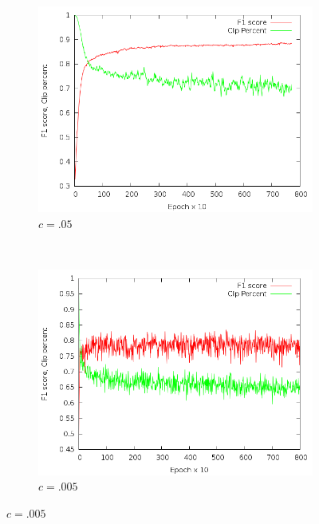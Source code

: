 \documentclass{article}
\begin{document}
\begin{figure}[t!]
    \centering
    \begin{subfigure}[t]{0.5\textwidth}
        \centering
       \includegraphics[scale=.2]{output05}
        \caption{$c=.05$}
    \end{subfigure}%
    ~ 
     \begin{subfigure}[t]{0.5\textwidth}
        \centering
       \includegraphics[scale=.2]{output005}
        \caption{$c=.005$}
    \end{subfigure}%


\end{figure}
\end{document}
